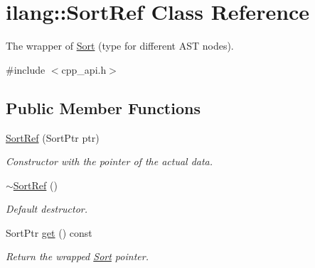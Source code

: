 \hypertarget{classilang_1_1_sort_ref}{}\section{ilang\+:\+:Sort\+Ref Class Reference}
\label{classilang_1_1_sort_ref}


The wrapper of \mbox{\hyperlink{classilang_1_1_sort}{Sort}} (type for different A\+ST nodes).  




{\ttfamily \#include $<$cpp\+\_\+api.\+h$>$}

\subsection*{Public Member Functions}
\begin{DoxyCompactItemize}
\item 
\mbox{\label{classilang_1_1_sort_ref_aeaae9eaaf95a1d58f4ea954734ef94a0}} 
\mbox{\hyperlink{classilang_1_1_sort_ref_aeaae9eaaf95a1d58f4ea954734ef94a0}{Sort\+Ref}} (Sort\+Ptr ptr)
\begin{DoxyCompactList}\small\item\em Constructor with the pointer of the actual data. \end{DoxyCompactList}\item 
\mbox{\label{classilang_1_1_sort_ref_ab342ad7a51c1a80e567fb73d70e33c24}} 
\mbox{\hyperlink{classilang_1_1_sort_ref_ab342ad7a51c1a80e567fb73d70e33c24}{$\sim$\+Sort\+Ref}} ()
\begin{DoxyCompactList}\small\item\em Default destructor. \end{DoxyCompactList}\item 
\mbox{\label{classilang_1_1_sort_ref_a938062b7e3dc9dd0d51002aa28e84171}} 
Sort\+Ptr \mbox{\hyperlink{classilang_1_1_sort_ref_a938062b7e3dc9dd0d51002aa28e84171}{get}} () const
\begin{DoxyCompactList}\small\item\em Return the wrapped \mbox{\hyperlink{classilang_1_1_sort}{Sort}} pointer. \end{DoxyCompactList}\end{DoxyCompactItemize}
